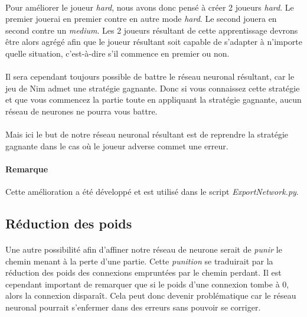 \documentclass{article}
\begin{document}
  \paragraph{}
    Pour améliorer le joueur \emph{hard}, nous avons donc pensé à créer 2 joueurs \emph{hard}. Le premier jouerai en premier contre en autre
    mode \emph{hard}. Le second jouera en second contre un \emph{medium}. Les 2 joueurs résultant de cette apprentissage devrons être alors 
    agrégé afin que le joueur résultant soit capable de s'adapter à n'importe quelle situation, c'est-à-dire s'il commence en premier ou non.
  \paragraph{}
    Il sera cependant toujours possible de battre le réseau neuronal résultant, car le jeu de Nim admet une stratégie gagnante. Donc si vous connaissez cette stratégie
    et que vous commencez la partie toute en appliquant la stratégie gagnante, aucun réseau de neurones ne pourra vous battre.
  \paragraph{}
    Mais ici le but de notre réseau neuronal résultant est de reprendre la stratégie gagnante dans le cas où le joueur adverse commet une erreur.
    
  \paragraph{Remarque}
    Cette amélioration a été développé et est utilisé dans le script \emph{ExportNetwork.py}.
    
  \subsection{Réduction des poids}
  \paragraph{}
    Une autre possibilité afin d’affiner notre réseau de neurone serait de \emph{punir} le chemin menant à la perte d'une partie.
    Cette \emph{punition} se traduirait par la réduction des poids des connexions empruntées par le chemin perdant.
    Il est cependant important de remarquer que si le poids d'une connexion tombe à 0, alors la connexion disparaît. Cela peut donc devenir problématique
    car le réseau neuronal pourrait s'enfermer dans des erreurs sans pouvoir se corriger.
\end{document}
